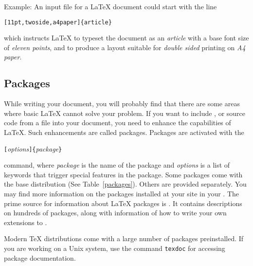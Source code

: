 Example: An input file for a \LaTeX{} document could start with the
line
\begin{code}
\verb|[11pt,twoside,a4paper]{article}|
\end{code}
which instructs \LaTeX{} to typeset the document as an \emph{article}
with a base font size of \emph{eleven points}, and to produce a
layout suitable for \emph{double sided} printing on \emph{A4 paper}.
\pagebreak[2]

\subsection{Packages}
 While writing your document, you will probably find
that there are some areas where basic \LaTeX{} cannot solve your
problem. If you want to include ,  or
source code from a file into your document, you need to enhance the
capabilities of \LaTeX.  Such enhancements are called packages.
Packages are activated with the
\begin{lscommand}
\verb|[|\emph{options}\verb|]{|\emph{package}\verb|}|
\end{lscommand}
\noindent command, where \emph{package} is the name of the package and
\emph{options} is a list of keywords that trigger special features in
the package. Some packages come with the \LaTeXe{} base distribution
(See Table~\ref{packages}). Others are provided separately. You may
find more information on the packages installed at your site in your
\guide. The prime source for information about \LaTeX{} packages is \companion.
It contains descriptions on hundreds of packages, along with
information of how to write your own extensions to \LaTeXe.

Modern \TeX{} distributions come with a large number of packages
preinstalled. If you are working on a Unix system, use the command
\texttt{texdoc} for accessing package documentation.

